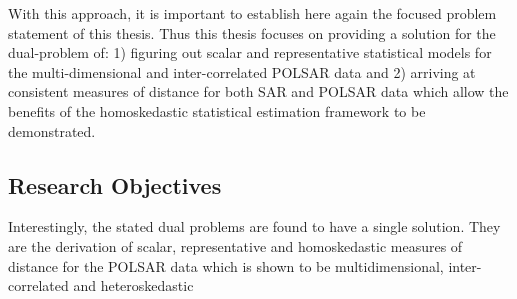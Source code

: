 With this approach, it is important to establish here again the focused problem statement of this thesis.
Thus
                this thesis focuses on providing a solution for the
                dual-problem of: 1) figuring out scalar and
                representative statistical models for the
                multi-dimensional and inter-correlated POLSAR data and
                2) arriving at consistent measures of distance for both
                SAR and POLSAR data which allow the benefits of the
                homoskedastic statistical estimation framework to be
                demonstrated.

\subsection{Research Objectives}
Interestingly, the stated dual problems are found to have a single solution.
They are the derivation of scalar, representative and homoskedastic measures of distance for the POLSAR data which is shown to be multidimensional, inter-correlated and heteroskedastic

